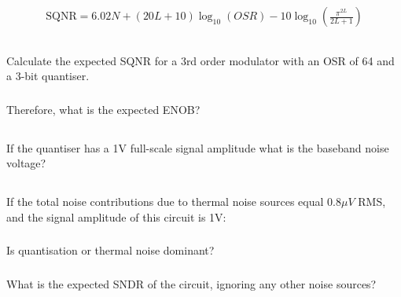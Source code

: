 \section{}

\begin{align}
    \text{SQNR} = 6.02N + (20L + 10)\log_{10}(OSR) - 10\log_{10}\left(\frac{\pi^{2L}}{2L+1}\right)
\end{align}

    \subsection{}
    Calculate the expected SQNR for a 3rd order modulator with an OSR of 64 and a 3-bit quantiser.


        \subsubsection{}

        Therefore, what is the expected ENOB?


    \subsection{}
    If the quantiser has a 1V full-scale signal amplitude what is the baseband noise voltage?

    \subsection{}
    If the total noise contributions due to thermal noise sources equal $0.8\mu V$ RMS, and the signal amplitude of this circuit is 1V:

        \subsubsection{}
        Is quantisation or thermal noise dominant?

        \subsubsection{}
        What is the expected SNDR of the circuit, ignoring any other noise sources?

